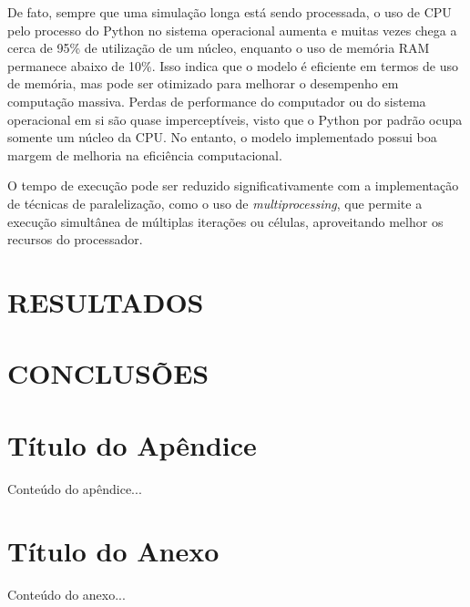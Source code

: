 \documentclass[12pt,oneside]{report}
\begin{document}
De fato, sempre que uma simulação longa está sendo processada, o uso de CPU pelo processo do Python no sistema operacional aumenta e muitas vezes chega a cerca de 95\% de utilização de um núcleo, enquanto o uso de memória RAM permanece abaixo de 10\%. Isso indica que o modelo é eficiente em termos de uso de memória, mas pode ser otimizado para melhorar o desempenho em computação massiva. Perdas de performance do computador ou do sistema operacional em si são quase imperceptíveis, visto que o Python por padrão ocupa somente um núcleo da CPU. No entanto, o modelo implementado possui boa margem de melhoria na eficiência computacional.

O tempo de execução pode ser reduzido significativamente com a implementação de técnicas de paralelização, como o uso de \textit{multiprocessing}, que permite a execução simultânea de múltiplas iterações ou células, aproveitando melhor os recursos do processador.




\chapter{RESULTADOS}

\chapter{CONCLUSÕES}

\printbibliography[title={REFERÊNCIAS},heading=bibnumbered]

\appendix

\chapter{Título do Apêndice}
Conteúdo do apêndice...

\chapter{Título do Anexo}
Conteúdo do anexo...
\end{document}
